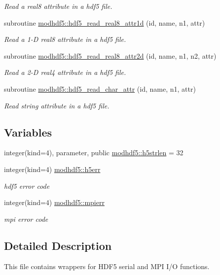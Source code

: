 \begin{DoxyCompactItemize}
\begin{DoxyCompactList}\small\item\em Read a real8 attribute in a hdf5 file. \end{DoxyCompactList}\item 
subroutine \hyperlink{namespacemodhdf5_a5010be0e91c8d56afbd40530b8064d6a}{modhdf5\+::hdf5\+\_\+read\+\_\+real8\+\_\+attr1d} (id, name, n1, attr)
\begin{DoxyCompactList}\small\item\em Read a 1-\/D real8 attribute in a hdf5 file. \end{DoxyCompactList}\item 
subroutine \hyperlink{namespacemodhdf5_a85144bc1c41d08550379f855b3974507}{modhdf5\+::hdf5\+\_\+read\+\_\+real8\+\_\+attr2d} (id, name, n1, n2, attr)
\begin{DoxyCompactList}\small\item\em Read a 2-\/D real4 attribute in a hdf5 file. \end{DoxyCompactList}\item 
subroutine \hyperlink{namespacemodhdf5_a2da336bc6d0ebbf1e6d582469b741a63}{modhdf5\+::hdf5\+\_\+read\+\_\+char\+\_\+attr} (id, name, n1, attr)
\begin{DoxyCompactList}\small\item\em Read string attribute in a hdf5 file. \end{DoxyCompactList}\end{DoxyCompactItemize}
\subsection*{Variables}
\begin{DoxyCompactItemize}
\item 
integer(kind=4), parameter, public \hyperlink{namespacemodhdf5_a74fed11716b5063ece33a584a5872f7a}{modhdf5\+::h5strlen} = 32
\item 
integer(kind=4) \hyperlink{namespacemodhdf5_a7c21e772a564aec00e44e46562e9e840}{modhdf5\+::h5err}
\begin{DoxyCompactList}\small\item\em hdf5 error code \end{DoxyCompactList}\item 
integer(kind=4) \hyperlink{namespacemodhdf5_a8d55ad41fc659457afec426d7eb3b2e8}{modhdf5\+::mpierr}
\begin{DoxyCompactList}\small\item\em mpi error code \end{DoxyCompactList}\end{DoxyCompactItemize}


\subsection{Detailed Description}
This file contains wrappers for H\+D\+F5 serial and M\+PI I/O functions. 

